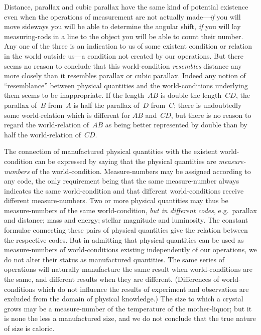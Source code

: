 \documentclass[12pt]{book}
\begin{document}
Distance, parallax and cubic parallax have the same kind of potential
existence even when the operations of measurement are not actually made---\emph{if}
you will move sideways you will be able to determine the angular shift, \emph{if}
you will lay measuring-rods in a line to the object you will be able to count
their number. Any one of the three is an indication to us of some existent
condition or relation in the world outside us---a condition not created by our
operations. But there seems no reason to conclude that this world-condition
\emph{resembles} distance any more closely than it resembles parallax or cubic
parallax. Indeed any notion of ``resemblance'' between physical quantities
and the world-conditions underlying them seems to be inappropriate. If the
length~$AB$ is double the length~$CD$, the parallax of~$B$ from~$A$ is half the parallax
of~$D$ from~$C$; there is undoubtedly some world-relation which is different
for $AB$ and~$CD$, but there is no reason to regard the world-relation of~$AB$ as
being better represented by double than by half the world-relation of~$CD$.

The connection of manufactured physical quantities with the existent
world-condition can be expressed by saying that the physical quantities are
\emph{measure-numbers} of the world-condition. Measure-numbers may be assigned
%
according to any code, the only requirement being that the same measure-number
always indicates the same world-condition and that different world-conditions
receive different measure-numbers. Two or more physical quantities
may thus be measure-numbers of the same world-condition, \emph{but in different
codes}, e.g.\ parallax and distance; mass and energy; stellar magnitude and luminosity.
The constant formulae connecting these pairs of physical quantities
give the relation between the respective codes. But in admitting that physical
quantities can be used as measure-numbers of world-conditions existing
independently of our operations, we do not alter their status as manufactured
quantities. The same series of operations will naturally manufacture the
same result when world-conditions are the same, and different results when
they are different. (Differences of world-conditions which do not influence
the results of experiment and observation are  excluded from the
domain of physical knowledge.) The size to which a crystal grows may be a
measure-number of the temperature of the mother-liquor; but it is none the
less a manufactured size, and we do not conclude that the true nature of size
is caloric.
\end{document}
